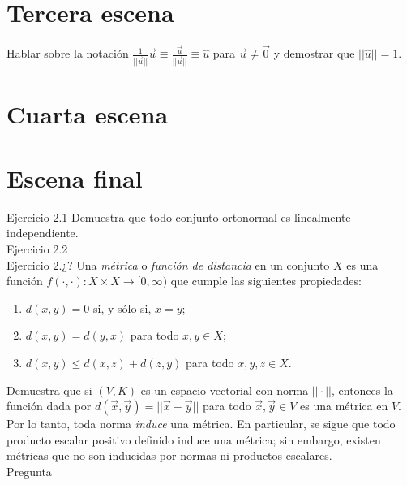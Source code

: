\documentclass[12pt,dvipsnames]{article}
\numberwithin{equation}{section}
\begin{document}

\newpage
\section{Tercera escena}

Hablar sobre la notación $\frac{1}{||\vec{u}||}\vec{u}\equiv \frac{\vec{u}}{||\vec{u}||}\equiv \hat{u}$ para $\vec{u}\neq\vec{0}$ y demostrar que $||\hat{u}|| = 1$.


\newpage
\section{Cuarta escena}


\newpage
\section{Escena final}


Ejercicio 2.1 Demuestra que todo conjunto ortonormal es linealmente independiente. \\

Ejercicio 2.2 \\

Ejercicio 2.¿? Una \emph{métrica} o \emph{función de distancia} en un conjunto $X$ es una función $f(\cdot, \cdot ):X\times X\to [0,\infty)$ que cumple las siguientes propiedades:
\begin{enumerate}[label=(\roman*)]
    \item $d(x,y)=0$ si, y sólo si, $x=y$;

    \item $d(x,y)=d(y,x)$ para todo $x,y\in X$;

    \item $d(x,y) \le d(x,z) + d(z,y)$ para todo $x,y,z\in X$.
\end{enumerate}

\noindent Demuestra que si $(V,K)$ es un espacio vectorial con norma $||\cdot||$, entonces la función dada por $d(\vec{x},\vec{y})=||\vec{x}-\vec{y}||$ para todo $\vec{x},\vec{y}\in V$ es una métrica en $V$. Por lo tanto, toda norma \emph{induce} una métrica. En particular, se sigue que todo producto escalar positivo definido induce una métrica; sin embargo, existen métricas que no son inducidas por normas ni productos escalares. \\

Pregunta 
\end{document}
